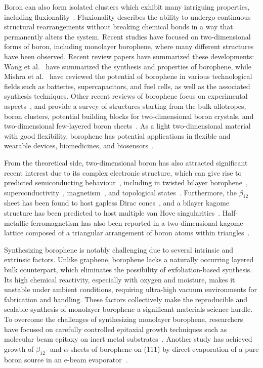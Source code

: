 Boron can also form isolated clusters which exhibit many intriguing properties,
including fluxionality~\cite{pan2019fluxional}.
Fluxionality describes the ability to undergo continuous structural rearrangements without breaking chemical bonds in a way that permanently alters the system.
Recent studies have focused on two-dimensional forms of boron,
including monolayer borophene, where many different structures have been observed.
Recent review papers have summarized these developments:
Wang et al.~\cite{wang2024borophene} have summarized the synthesis and properties of borophene,
while Mishra et al.~\cite{mishra2024borophene} have reviewed the potential of borophene in various technological fields such as batteries, supercapacitors, and fuel cells, as well as the associated synthesis techniques.
Other recent reviews of borophene focus on experimental aspects~\cite{mohanty2023review,yang2023borophenes,kumar2024,xie2020two},
and provide a survey of structures starting from the bulk allotropes, boron clusters,
potential building blocks for two-dimensional boron crystals, and two-dimensional few-layered boron sheets~\cite{sun2017two}.
As a light two-dimensional material with good flexibility,
borophene has potential applications in flexible and wearable devices, biomedicines,
and biosensors~\cite{mozvashi2021mechanical,zhang2017elasticity}.

From the theoretical side,
two-dimensional boron has also attracted significant recent interest due to its complex electronic structure,
which can give rise to predicted semiconducting behaviour~\cite{qureshi2024bilayer},
including in twisted bilayer borophene~\cite{jin2022tuning},
superconductivity~\cite{gao2017prediction,han2023superconducting},
magnetism~\cite{zhu2019magnetic}, and topological states~\cite{wang2025second,rakshit2025exploring,wang2019serendipity}.
Furthermore, the $\beta_{12}$ sheet has been found to host gapless Dirac cones~\cite{feng2017dirac},
and a bilayer kagome structure has been predicted to host multiple van Hove singularities~\cite{gao2024bilayer}.
Half-metallic ferromagnetism has also been reported in a two-dimensional kagome lattice composed of a triangular arrangement of boron atoms within triangles~\cite{kim2017boron}.

Synthesizing borophene is notably challenging due to several intrinsic and extrinsic factors.
Unlike graphene, borophene lacks a naturally occurring layered bulk counterpart,
which eliminates the possibility of exfoliation-based synthesis.
Its high chemical reactivity,
especially with oxygen and moisture, makes it unstable under ambient conditions,
requiring ultra-high vacuum environments for fabrication and handling.
These factors collectively make the reproducible and scalable synthesis of monolayer borophene a significant materials science hurdle.
To overcome the challenges of synthesizing monolayer borophene,
researchers have focused on carefully controlled epitaxial growth techniques such as molecular beam epitaxy on inert metal substrates~\cite{chen2022synthesis}.
Another study has achieved growth of $\beta_{12}$- and $\alpha$-sheets of borophene on (111) by direct evaporation of a pure boron source in an e-beam evaporator~\cite{zhong2017metastable}.

